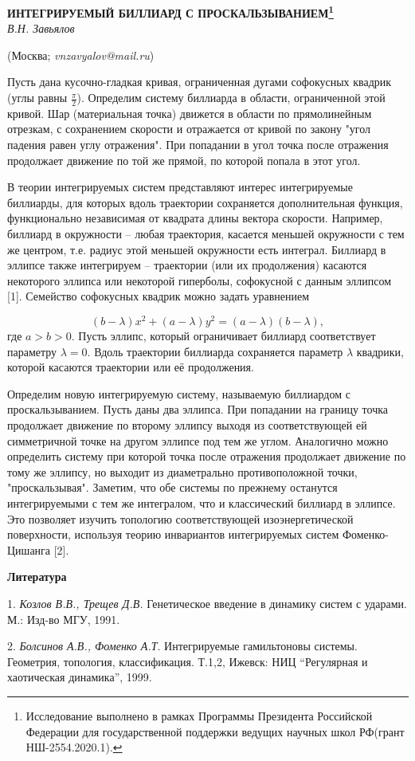 
\begin{center}
    {\bf ИНТЕГРИРУЕМЫЙ БИЛЛИАРД С ПРОСКАЛЬЗЫВАНИЕМ\footnote{Исследование выполнено в рамках Программы Президента Российской Федерации для государственной поддержки ведущих научных школ РФ(грант НШ-2554.2020.1).}}\\

    {\it В.Н. Завьялов}

    (Москва; {\it vnzavyalov@mail.ru})
\end{center}


Пусть дана кусочно-гладкая кривая, ограниченная дугами софокусных квадрик  (углы равны $\frac{\pi}{2}$). Определим систему биллиарда в области, ограниченной этой кривой. Шар (материальная точка) движется в области по прямолинейным отрезкам, с сохранением скорости и отражается от кривой по закону "угол падения равен углу отражения". При попадании в угол точка после отражения продолжает движение по той же прямой, по которой попала в этот угол.

В теории интегрируемых систем представляют интерес интегрируемые биллиарды, для которых вдоль траектории сохраняется дополнительная функция, функционально независимая от квадрата длины вектора скорости. Например, биллиард в окружности – любая траектория, касается меньшей окружности с тем же центром, т.е. радиус этой меньшей окружности есть интеграл. Биллиард в эллипсе также интегрируем – траектории (или их продолжения) касаются некоторого эллипса или некоторой гиперболы, софокусной с данным эллипсом [1].
Семейство софокусных квадрик можно задать уравнением

$$(b-\lambda)x^2+(a-\lambda)y^2=(a-\lambda)(b-\lambda),$$
где $a>b>0.$  Пусть эллипс, который ограничивает биллиард соответствует параметру $\lambda=0.$ Вдоль траектории биллиарда сохраняется параметр $\lambda$ квадрики, которой касаются траектории или её продолжения.

Определим новую интегрируемую систему, называемую биллиардом с проскальзыванием. Пусть даны два эллипса. При попадании на границу точка продолжает движение по второму эллипсу выходя из соответствующей ей симметричной точке на другом эллипсе под тем же углом. Аналогично можно определить систему при которой точка после отражения продолжает движение по тому же эллипсу, но выходит из диаметрально противоположной точки, "проскальзывая". Заметим, что обе системы по прежнему останутся интегрируемыми с тем же интегралом, что и классический биллиард в эллипсе. Это позволяет изучить топологию соответствующей изоэнергетической поверхности, используя теорию инвариантов интегрируемых систем Фоменко-Цишанга [2].



\smallskip \centerline {\bf Литература} \nopagebreak

1. {\it Козлов В.В., Трещев Д.В.} Генетическое введение в динамику систем с ударами. М.: Изд-во МГУ,  1991.

2. {\it Болсинов А.В., Фоменко А.Т}. Интегрируемые гамильтоновы системы. Геометрия, топология, классификация. Т.1,2, Ижевск: НИЦ “Регулярная и хаотическая динамика”,  1999.



